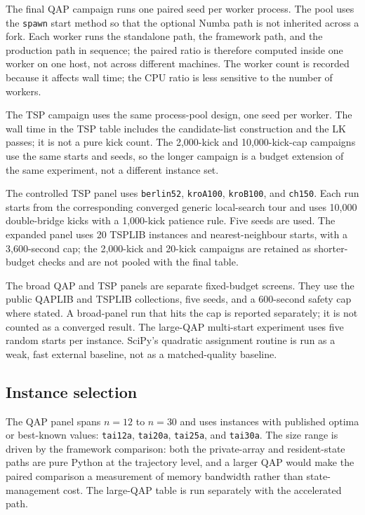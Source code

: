 \documentclass[pdflatex,sn-mathphys-num]{sn-jnl}
\begin{document}
The final QAP campaign runs one paired seed per worker process. The pool uses the \texttt{spawn}
start method so that the optional Numba path is not inherited across a fork. Each worker runs the
standalone path, the framework path, and the production path in sequence; the paired ratio is
therefore computed inside one worker on one host, not across different machines. The worker count is
recorded because it affects wall time; the CPU ratio is less sensitive to the number of workers.

The TSP campaign uses the same process-pool design, one seed per worker. The wall time in the TSP
table includes the candidate-list construction and the LK passes; it is not a pure kick count. The
2,000-kick and 10,000-kick-cap campaigns use the same starts and seeds, so the longer campaign is a budget
extension of the same experiment, not a different instance set.

The controlled TSP panel uses \texttt{berlin52}, \texttt{kroA100}, \texttt{kroB100}, and
\texttt{ch150}. Each run starts from the corresponding converged generic local-search tour and uses
10,000 double-bridge kicks with a 1,000-kick patience rule. Five seeds are used. The expanded panel
uses 20 TSPLIB instances and nearest-neighbour starts, with a 3,600-second cap; the 2,000-kick and
20-kick campaigns are retained as shorter-budget checks and are not pooled with the final table.

The broad QAP and TSP panels are separate fixed-budget screens. They use the public QAPLIB and TSPLIB
collections, five seeds, and a 600-second safety cap where stated. A broad-panel run that hits the cap
is reported separately; it is not counted as a converged result. The large-QAP multi-start experiment
uses five random starts per instance. SciPy's quadratic assignment routine
\citep{virtanen2020} is run as a weak, fast external baseline, not as a matched-quality baseline.

\subsection{Instance selection}

The QAP panel spans $n=12$ to $n=30$ and uses instances with published optima or best-known values:
\texttt{tai12a}, \texttt{tai20a}, \texttt{tai25a}, and \texttt{tai30a}. The size range is driven by
the framework comparison: both the private-array and resident-state paths are pure Python at the
trajectory level, and a larger QAP would make the paired comparison a measurement of memory bandwidth
rather than state-management cost. The large-QAP table is run separately with the accelerated path.
\end{document}
